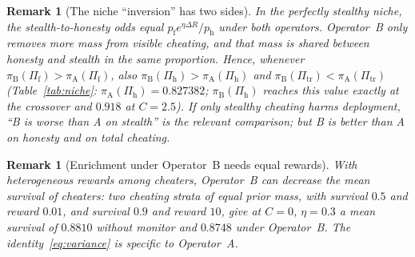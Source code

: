 \documentclass[11pt,a4paper]{article}
\newtheorem{remark}[theorem]{Remark}
\begin{document}
\begin{remark}[The niche ``inversion'' has two sides]\label{rem:niche}
In the perfectly stealthy niche, the stealth-to-honesty odds equal $p_{\mathrm{f}}e^{\eta\Delta R}/p_{\mathrm{h}}$ under both operators. Operator~B only removes more mass from visible cheating, and that mass is shared between honesty and stealth in the same proportion. Hence, whenever $\pi_{\mathrm{B}}(\Pi_{\mathrm{f}}) > \pi_{\mathrm{A}}(\Pi_{\mathrm{f}})$, also $\pi_{\mathrm{B}}(\Pi_{\mathrm{h}}) > \pi_{\mathrm{A}}(\Pi_{\mathrm{h}})$ and $\pi_{\mathrm{B}}(\Pi_{\mathrm{tr}}) < \pi_{\mathrm{A}}(\Pi_{\mathrm{tr}})$ (Table~\ref{tab:niche}: $\pi_{\mathrm{A}}(\Pi_{\mathrm{h}}) = 0.827382$; $\pi_{\mathrm{B}}(\Pi_{\mathrm{h}})$ reaches this value exactly at the crossover and $0.918$ at $C = 2.5$). If only stealthy cheating harms deployment, ``B is worse than A on stealth'' is the relevant comparison; but B is better than A on honesty and on total cheating.
\end{remark}

\begin{remark}[Enrichment under Operator~B needs equal rewards]
With heterogeneous rewards among cheaters, Operator~B can \emph{decrease} the mean survival of cheaters: two cheating strata of equal prior mass, with survival $0.5$ and reward $0.01$, and survival $0.9$ and reward $10$, give at $C = 0$, $\eta = 0.3$ a mean survival of $0.8810$ without monitor and $0.8748$ under Operator~B. The identity~\eqref{eq:variance} is specific to Operator~A.
\end{remark}
\end{document}
